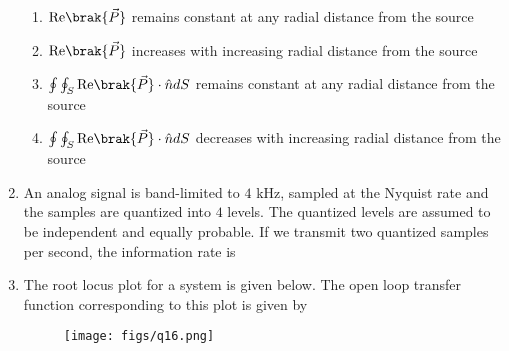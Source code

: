\documentclass[a4paper, 11pt]{article}
\begin{document}
\begin{enumerate}
    \begin{enumerate}
        \item $\text{Re}\brak{\vec{P}}$ remains constant at any radial distance from the source
        \item $\text{Re}\brak{\vec{P}}$ increases with increasing radial distance from the source
        \item $\oint\oint_{S}\text{Re}\brak{\vec{P}} \cdot \hat{n} dS$ remains constant at any radial distance from the source
        \item $\oint\oint_{S}\text{Re}\brak{\vec{P}} \cdot \hat{n} dS$ decreases with increasing radial distance from the source
    \end{enumerate}

    \hfill{}

    \item An analog signal is band-limited to $4$ kHz, sampled at the Nyquist rate and the samples are quantized into $4$ levels. The quantized levels are assumed to be independent and equally probable. If we transmit two quantized samples per second, the information rate is
    
    \begin{enumerate}
    \end{enumerate}
    
    \hfill{}

    \item The root locus plot for a system is given below. The open loop transfer function corresponding to this plot is given by
    
    \begin{figure}[H]
        \centering
        \texttt{[image: figs/q16.png]}
        \caption*{}
        \label{fig:q16}
    \end{figure}
    
    \begin{enumerate}
    \end{enumerate}


\end{enumerate}
\end{document}
